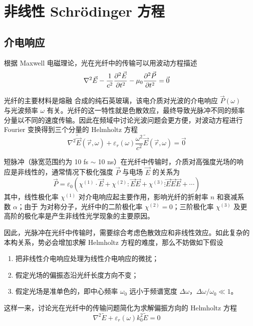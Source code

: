 \section{非线性 Schr\"odinger 方程}
\label{sec:NLSE}
\subsection{介电响应}

根据 Maxwell 电磁理论，光在光纤中的传输可以用波动方程描述
\begin{equation}
    \nabla^2\vec{E}-\frac{1}{c^2}\frac{\partial^2\vec{E}}{\partial t^2}-\mu_0\frac{\partial^2\vec{P}}{\partial t^2}=\vec{0}\\
\end{equation}

光纤的主要材料是熔融  合成的纯石英玻璃，该电介质对光波的介电响应 $\vec{P}(\omega)$ 与光波频率 $\omega$ 有关。光纤的这一特性就是色散效应，最终导致光脉冲不同的频率分量以不同的速度传输。因此在频域中讨论光波问题会更方便，对波动方程进行 Fourier 变换得到三个分量的 Helmholtz 方程
\begin{equation}
    \nabla^2\widetilde{\vec{E}}(\vec{r},\omega)+\varepsilon_r(\omega)\frac{\omega^2}{c^2}\widetilde{\vec{E}}(\vec{r},\omega)=\vec{0}
\end{equation}

短脉冲（脉宽范围约为 10 fs $\sim$ 10 ns）在光纤中传输时，介质对高强度光场的响应是非线性的，通常情况下极化强度 $\vec{P}$ 与电场 $\vec{E}$ 的关系为
\begin{equation}
    \vec{P}=\varepsilon_0\left(\chi^{(1)}\cdot\vec{E}+\chi^{(2)}:\vec{E}\vec{E}+\chi^{(3)}\vdots\vec{E}\vec{E}\vec{E}+\cdots\right)    
\end{equation}
其中，线性极化率 $\chi^{(1)}$ 对介电响应起主要作用，影响光纤的折射率 $n$ 和衰减系数 $\alpha$；由于  为对称分子，光纤中的二阶极化率 $\chi^{(2)}=0$；三阶极化率 $\chi^{(3)}$ 及更高阶的极化率是产生非线性光学现象的主要原因。

因此，光脉冲在光纤中传输时，需要综合考虑色散效应和非线性效应。如此复杂的本构关系，势必会增加求解 Helmholtz 方程的难度，那么不妨做如下假设\cite{Agrawal}
\begin{enumerate}[label=(\arabic*)]
    \item 把非线性介电响应处理为线性介电响应的微扰；
    \item 假定光场的偏振态沿光纤长度方向不变；
    \item 假定光场是准单色的，即中心频率 $\omega_0$ 远小于频谱宽度 $\Delta\omega$，$\Delta\omega/\omega_0\ll1$。
\end{enumerate}
这样一来，讨论光在光纤中的传输问题简化为求解偏振方向的  Helmholtz 方程
\begin{equation}
    \nabla^2\widetilde{E}+\varepsilon_r(\omega)k_0^2\widetilde{E}=0
    \label{eq:Helmholtz}
\end{equation}

